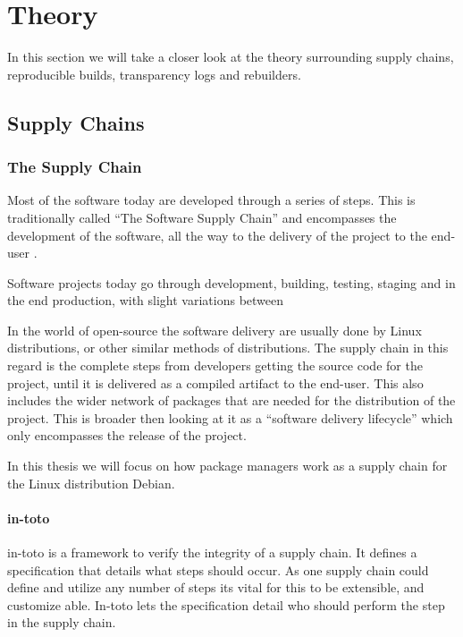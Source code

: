 \documentclass[../Main/thesis.tex]{subfiles}
\begin{document}
\chapter{Theory}
\label{ch:theory}
In this section we will take a closer look at the theory surrounding
supply chains, reproducible builds, transparency logs and rebuilders.

\section{Supply Chains}\label{sec:supply_chain}
\subsection*{The Supply Chain}

Most of the software today are developed through a series of steps. This is
traditionally called ``The Software Supply Chain'' and encompasses the
development of the software, all the way to the delivery of the project to the
end-user \cite{rj-ellison-2010}.

Software projects today go through development, building, testing, staging and
in the end production, with slight variations between 

In the world of open-source the software delivery are usually done by Linux
distributions, or other similar methods of distributions. The supply chain in
this regard is the complete steps from developers getting the source code for
the project, until it is delivered as a compiled artifact to the end-user. This
also includes the wider network of packages that are needed for the distribution
of the project. This is broader then looking at it as a ``software delivery
lifecycle'' which only encompasses the release of the project.

In this thesis we will focus on how package managers work as a supply chain for
the Linux distribution Debian.


\subsubsection*{in-toto}
in-toto is a framework to verify the integrity of a supply chain. It defines a
specification that details what steps should occur. As one supply chain could
define and utilize any number of steps its vital for this to be extensible, and
customize able. In-toto lets the specification detail who should perform the
step in the supply chain.
\end{document}
